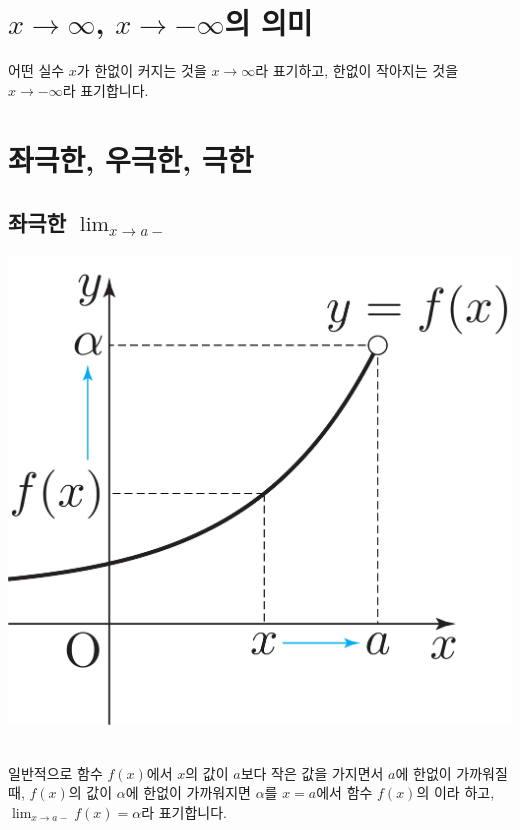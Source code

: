 

\section{$x \to \infty$, $x \to -\infty$의 의미}
어떤 실수 $x$가 한없이 커지는 것을 $x \to \infty$라 표기하고, 한없이 작아지는 것을 $x \to -\infty$라 표기합니다.

\section{좌극한, 우극한, 극한}
\subsection{좌극한 $\lim_{x \to a-}$}
\begin{center}
\includegraphics[scale=\pgfkeysvalueof{picsize}]{DBs/pic/zerr_02.pdf}\
\end{center}일반적으로 함수 $f\left( x \right) $에서 $x$의 값이 $a$보다 작은 값을 가지면서 $a$에 한없이 가까워질 때, $f\left( x \right) $의 값이 $\alpha$에 한없이 가까워지면 $\alpha$를 $x=a$에서 함수 $f\left( x \right) $의 이라 하고, $\lim_{x \to a-}f\left( x \right) = \alpha$라 표기합니다.
